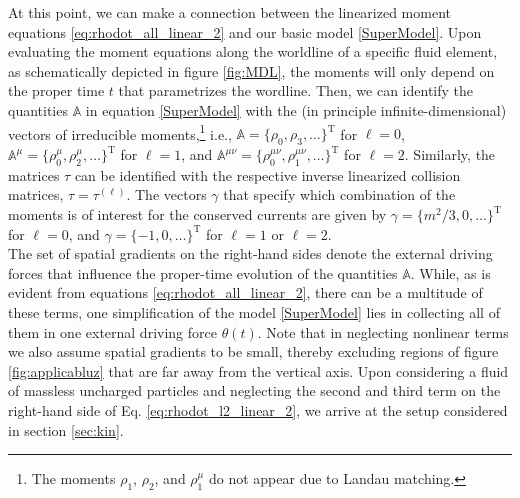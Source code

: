 \documentclass[a4paper, amsfonts, amssymb, amsmath, reprint, showkeys, nofootinbib, twoside, onecolumn,notitlepage]{revtex4-2}
\begin{document}
At this point, we can make a connection between the linearized moment equations \eqref{eq:rhodot_all_linear_2} and our basic model \eqref{SuperModel}. Upon evaluating the moment equations along the worldline of a specific fluid element, as schematically depicted in figure \ref{fig:MDL}, the moments will only depend on the proper time $t$ that parametrizes the wordline. Then, we can identify the quantities $\mathbb{A}$ in equation \eqref{SuperModel} with the (in principle infinite-dimensional) vectors of irreducible moments,\footnote{The moments $\rho_1$, $\rho_2$, and $\rho_1^\mu$ do not appear due to Landau matching.} i.e., $\mathbb{A}=\{\rho_0,\rho_3,\ldots\}^\mathrm{T}$ for $\ell=0$, $\mathbb{A}^\mu=\{\rho_0^\mu,\rho_2^\mu,\ldots\}^\mathrm{T}$ for $\ell=1$, and  $\mathbb{A}^{\mu\nu}=\{\rho_0^{\mu\nu},\rho_1^{\mu\nu},\ldots\}^\mathrm{T}$ for $\ell=2$. Similarly, the matrices $\tau$ can be identified with the respective inverse linearized collision matrices, $\tau=\tau^{(\ell)}$. The vectors $\gamma$ that specify which combination of the moments is of interest for the conserved currents are given by $\gamma=\{m^2/3,0,\ldots\}^\mathrm{T}$ for $\ell=0$, and $\gamma=\{-1,0,\ldots\}^\mathrm{T}$ for $\ell=1$ or $\ell=2$.\\
The set of spatial gradients on the right-hand sides denote the external driving forces that influence the proper-time evolution of the quantities $\mathbb{A}$. While, as is evident from equations \eqref{eq:rhodot_all_linear_2}, there can be a multitude of these terms, one simplification of the model \eqref{SuperModel} lies in collecting all of them in one external driving force $\theta(t)$. Note that in neglecting nonlinear terms we also assume spatial gradients to be small, thereby excluding regions of figure \ref{fig:applicabluz} that are far away from the vertical axis.
Upon considering a fluid of massless uncharged particles and neglecting the second and third term on the right-hand side of Eq. \eqref{eq:rhodot_l2_linear_2}, we arrive at the setup considered in section \ref{sec:kin}.






\label{lastpage}
\end{document}
